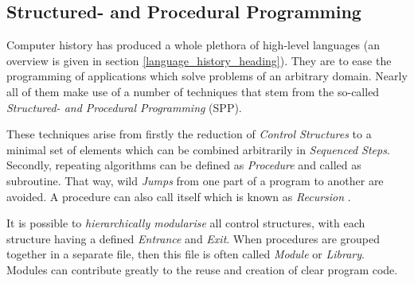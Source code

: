 %
%
%
%
%
%
%

\subsection{Structured- and Procedural Programming}
\label{structured_and_procedural_programming_heading}

Computer history has produced a whole plethora of high-level languages (an
overview is given in section \ref{language_history_heading}). They are to ease
the programming of applications which solve problems of an arbitrary domain.
Nearly all of them make use of a number of techniques that stem from the
so-called \emph{Structured- and Procedural Programming} (SPP).

These techniques arise from firstly the reduction of \emph{Control Structures} to a
minimal set of elements which can be combined arbitrarily in \emph{Sequenced Steps}.
Secondly, repeating algorithms can be defined as \emph{Procedure} and called as
subroutine. That way, wild \emph{Jumps} from one part of a program to another
are avoided. A procedure can also call itself which is known as \emph{Recursion}
\cite{philippow}.

It is possible to \emph{hierarchically modularise} all control structures, with
each structure having a defined \emph{Entrance} and \emph{Exit}. When
procedures are grouped together in a separate file, then this file is often
called \emph{Module} or \emph{Library}. Modules can contribute greatly to the
reuse and creation of clear program code.

